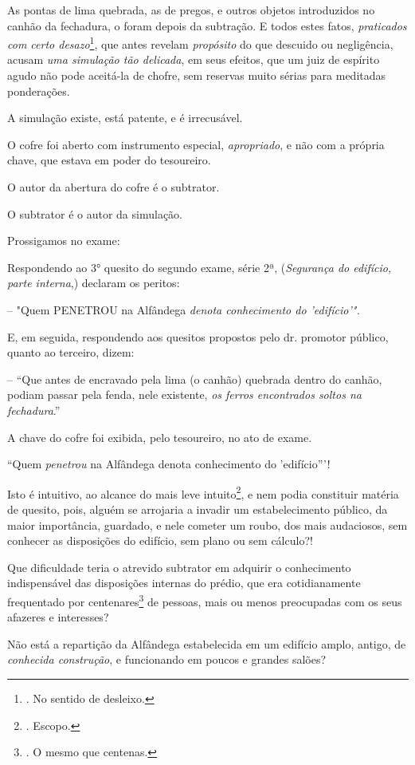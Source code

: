 As pontas de lima quebrada, as de pregos, e outros objetos introduzidos
no canhão da fechadura, o foram depois da subtração. E todos estes
fatos, \emph{praticados com certo desazo}\footnote{. No sentido de
  desleixo.}, que antes revelam \emph{propósito} do que descuido ou
negligência, acusam \emph{uma simulação tão delicada}, em seus efeitos,
que um juiz de espírito agudo não pode aceitá-la de chofre, sem reservas
muito sérias para meditadas ponderações.

A simulação existe, está patente, e é irrecusável.

O cofre foi aberto com instrumento especial, \emph{apropriado}, e não
com a própria chave, que estava em poder do tesoureiro.

O autor da abertura do cofre é o subtrator.

O subtrator é o autor da simulação.

Prossigamos no exame:

Respondendo ao 3° quesito do segundo exame, série 2ª, (\emph{Segurança
do edifício, parte interna},) declaram os peritos:

-- "Quem PENETROU na Alfândega \emph{denota conhecimento do
'edifício'".}

E, em seguida, respondendo aos quesitos propostos pelo dr. promotor
público, quanto ao terceiro, dizem:

-- ``Que antes de encravado pela lima (o canhão) quebrada dentro do
canhão, podiam passar pela fenda, nele existente, \emph{os ferros
encontrados soltos na fechadura}.''

A chave do cofre foi exibida, pelo tesoureiro, no ato de exame.

``Quem \emph{penetrou} na Alfândega denota conhecimento do 'edifício'''!

Isto é intuitivo, ao alcance do mais leve intuito\footnote{. Escopo.}, e
nem podia constituir matéria de quesito, pois, alguém se arrojaria a
invadir um estabelecimento público, da maior importância, guardado, e
nele cometer um roubo, dos mais audaciosos, sem conhecer as disposições
do edifício, sem plano ou sem cálculo?!

Que dificuldade teria o atrevido subtrator em adquirir o conhecimento
indispensável das disposições internas do prédio, que era cotidianamente
frequentado por centenares\footnote{. O mesmo que centenas.} de pessoas,
mais ou menos preocupadas com os seus afazeres e interesses?

Não está a repartição da Alfândega estabelecida em um edifício amplo,
antigo, de \emph{conhecida construção}, e funcionando em poucos e
grandes salões?

